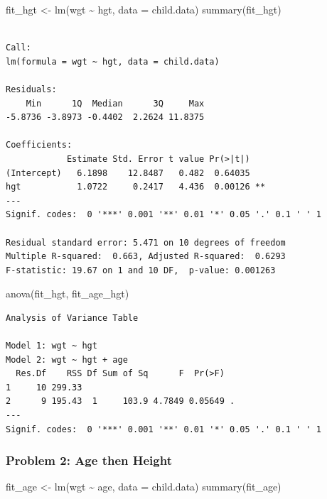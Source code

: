 \documentclass[
  letterpaper,
]{scrbook}
\newenvironment{Shaded}{\begin{snugshade}}{\end{snugshade}}
\newcommand{\AttributeTok}[1]{\textcolor[rgb]{0.40,0.45,0.13}{#1}}
\newcommand{\FunctionTok}[1]{\textcolor[rgb]{0.28,0.35,0.67}{#1}}
\newcommand{\NormalTok}[1]{\textcolor[rgb]{0.00,0.23,0.31}{#1}}
\newcommand{\OtherTok}[1]{\textcolor[rgb]{0.00,0.23,0.31}{#1}}
\newcommand{\SpecialCharTok}[1]{\textcolor[rgb]{0.37,0.37,0.37}{#1}}
\begin{document}
\begin{Shaded}
\begin{Highlighting}[]
\NormalTok{fit\_hgt }\OtherTok{\textless{}{-}} \FunctionTok{lm}\NormalTok{(wgt }\SpecialCharTok{\textasciitilde{}}\NormalTok{ hgt, }\AttributeTok{data =}\NormalTok{ child.data)}
\FunctionTok{summary}\NormalTok{(fit\_hgt)}
\end{Highlighting}
\end{Shaded}

\begin{verbatim}

Call:
lm(formula = wgt ~ hgt, data = child.data)

Residuals:
    Min      1Q  Median      3Q     Max 
-5.8736 -3.8973 -0.4402  2.2624 11.8375 

Coefficients:
            Estimate Std. Error t value Pr(>|t|)   
(Intercept)   6.1898    12.8487   0.482  0.64035   
hgt           1.0722     0.2417   4.436  0.00126 **
---
Signif. codes:  0 '***' 0.001 '**' 0.01 '*' 0.05 '.' 0.1 ' ' 1

Residual standard error: 5.471 on 10 degrees of freedom
Multiple R-squared:  0.663, Adjusted R-squared:  0.6293 
F-statistic: 19.67 on 1 and 10 DF,  p-value: 0.001263
\end{verbatim}

\begin{Shaded}
\begin{Highlighting}[]
\FunctionTok{anova}\NormalTok{(fit\_hgt, fit\_age\_hgt)}
\end{Highlighting}
\end{Shaded}

\begin{verbatim}
Analysis of Variance Table

Model 1: wgt ~ hgt
Model 2: wgt ~ hgt + age
  Res.Df    RSS Df Sum of Sq      F  Pr(>F)  
1     10 299.33                              
2      9 195.43  1     103.9 4.7849 0.05649 .
---
Signif. codes:  0 '***' 0.001 '**' 0.01 '*' 0.05 '.' 0.1 ' ' 1
\end{verbatim}

\subsubsection{Problem 2: Age then
Height}\label{problem-2-age-then-height}

\begin{Shaded}
\begin{Highlighting}[]
\NormalTok{fit\_age }\OtherTok{\textless{}{-}} \FunctionTok{lm}\NormalTok{(wgt }\SpecialCharTok{\textasciitilde{}}\NormalTok{ age, }\AttributeTok{data =}\NormalTok{ child.data)}
\FunctionTok{summary}\NormalTok{(fit\_age)}
\end{Highlighting}
\end{Shaded}
\end{document}
